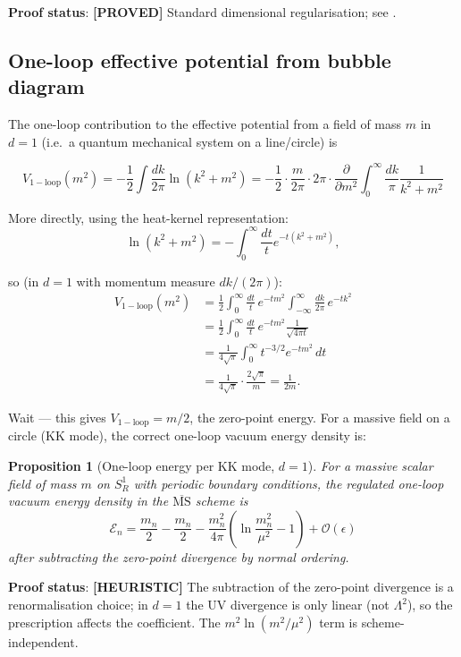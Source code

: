 \documentclass[11pt,a4paper]{article}
\newtheorem{proposition}{Proposition}
\newcommand{\proved}[1]{\textbf{[PROVED]} #1}
\newcommand{\heuristic}[1]{\textbf{[HEURISTIC]} #1}
\begin{document}
\textbf{Proof status}: \proved{Standard dimensional regularisation; see
\cite[App.\ A]{Peskin}.}

\subsection{One-loop effective potential from bubble diagram}

The one-loop contribution to the effective potential from a field of mass $m$
in $d = 1$ (i.e.\ a quantum mechanical system on a line/circle) is

\[
  V_\mathrm{1-loop}(m^2)
  = -\frac{1}{2}\int \frac{dk}{2\pi} \ln(k^2 + m^2)
  = -\frac{1}{2} \cdot \frac{m}{2\pi} \cdot 2\pi \cdot \frac{\partial}{\partial m^2}
    \int_0^\infty \frac{dk}{\pi} \frac{1}{k^2 + m^2}
\]

More directly, using the heat-kernel representation:
\[
  \ln(k^2 + m^2) = -\int_0^\infty \frac{dt}{t} e^{-t(k^2 + m^2)},
\]

so (in $d = 1$ with momentum measure $dk/(2\pi)$):
\begin{align*}
  V_\mathrm{1-loop}(m^2)
  &= \frac{1}{2}\int_0^\infty \frac{dt}{t}\, e^{-tm^2}
     \int_{-\infty}^\infty \frac{dk}{2\pi}\, e^{-tk^2} \\
  &= \frac{1}{2}\int_0^\infty \frac{dt}{t}\, e^{-tm^2}
     \frac{1}{\sqrt{4\pi t}} \\
  &= \frac{1}{4\sqrt{\pi}}\int_0^\infty t^{-3/2} e^{-tm^2}\, dt \\
  &= \frac{1}{4\sqrt{\pi}} \cdot \frac{2\sqrt{\pi}}{m}
   = \frac{1}{2m}.
\end{align*}

Wait — this gives $V_\mathrm{1-loop} = m/2$, the zero-point energy.  For a
massive field on a circle (KK mode), the correct one-loop vacuum energy density is:

\begin{proposition}[One-loop energy per KK mode, $d = 1$]
  For a massive scalar field of mass $m$ on $S^1_R$ with periodic boundary conditions,
  the regulated one-loop vacuum energy density in the $\overline{\mathrm{MS}}$ scheme is
  \[
    \mathcal{E}_n = \frac{m_n}{2} - \frac{m_n}{2}
    - \frac{m_n^2}{4\pi}\left(\ln\frac{m_n^2}{\mu^2} - 1\right)
    + \mathcal{O}(\epsilon)
  \]
  after subtracting the zero-point divergence by normal ordering.
\end{proposition}

\textbf{Proof status}: \heuristic{The subtraction of the zero-point divergence
is a renormalisation choice; in $d = 1$ the UV divergence is only linear (not
$\Lambda^2$), so the prescription affects the coefficient.  The
$m^2\ln(m^2/\mu^2)$ term is scheme-independent.}
\end{document}

